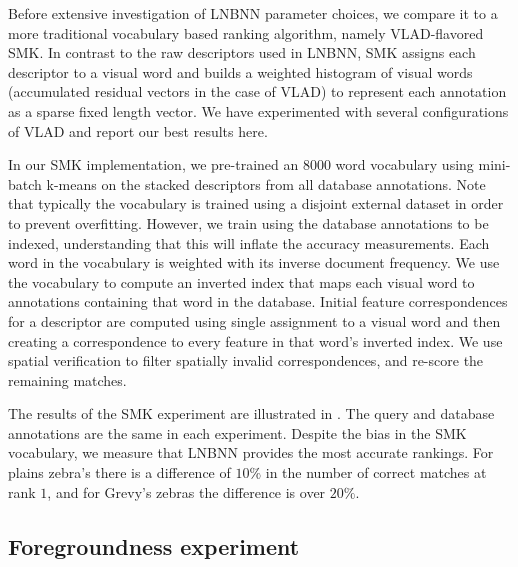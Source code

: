         Before extensive investigation of LNBNN parameter choices, we compare it to a more traditional vocabulary
          based ranking algorithm, namely VLAD-flavored SMK.
        In contrast to the raw descriptors used in LNBNN, SMK assigns each descriptor to a visual word and builds
          a weighted histogram of visual words (accumulated residual vectors in the case of VLAD) to represent each
          annotation as a sparse fixed length vector.
        We have experimented with several configurations of VLAD and report our best results here.

        In our SMK implementation, we pre-trained an $8000$ word vocabulary using mini-batch k-means on the
          stacked descriptors from all database annotations.
        Note that typically the vocabulary is trained using a disjoint external dataset in order to prevent
          overfitting.
        However, we \naively{} train using the database annotations to be indexed, understanding that this will
          inflate the accuracy measurements.
        Each word in the vocabulary is weighted with its inverse document frequency.
        We use the vocabulary to compute an inverted index that maps each visual word to annotations containing
          that word in the database.
        Initial feature correspondences for a descriptor are computed using single assignment to a visual word
          and then creating a correspondence to every feature in that word's inverted index.
        We use spatial verification to filter spatially invalid correspondences, and re-score the remaining
          matches.

        \SMKExpt{}

        The results of the SMK experiment are illustrated in .
        The query and database annotations are the same in each experiment.
        Despite the bias in the SMK vocabulary, we measure that LNBNN provides the most accurate rankings.
        For plains zebra's there is a difference of $10\percent$ in the number of correct matches at rank $1$,
          and for Grevy's zebras the difference is over $20\percent$.


    \subsection{Foregroundness experiment}\label{sub:exptfg}

        \ForegroundExpt{}

